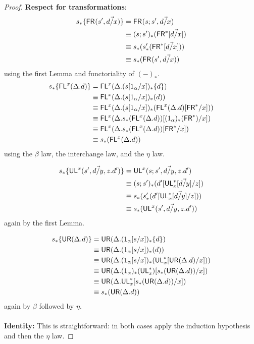 \begin{proof}
\textbf{Respect for transformations}:
\begin{align*}
s_*\{\mathsf{FR}_{}(s',\vec{d/x})\} 
&= \mathsf{FR}_{}(s;s',\vec{d/x}) \\
&\equiv (s;s')_*(\mathsf{FR}^*[\vec{d/x}]) \\
&\equiv s_*(s'_*(\mathsf{FR}^*[\vec{d/x}])) \\
&\equiv s_*(\mathsf{FR}_{}(s',\vec{d/x}))
\end{align*}
using the first Lemma and functoriality of $(-)_*$.
\begin{align*}
s_*\{\mathsf{FL}^{x}(\Delta.d)\} 
&= \mathsf{FL}^{x}(\Delta.(s[1_\alpha/x])_*\{d\}) \\
&\equiv \mathsf{FL}^{x}(\Delta.(s[1_\alpha/x])_*(d)) \\
&\equiv \mathsf{FL}^{x}(\Delta.(s[1_\alpha/x])_*(\mathsf{FL}^{x}(\Delta.d)[\mathsf{FR}^*/x]))\\
&\equiv \mathsf{FL}^{x}(\Delta. s_*(\mathsf{FL}^{x}(\Delta.d))[(1_\alpha)_*(\mathsf{FR}^*)/x])\\
&\equiv \mathsf{FL}^{x}(\Delta. s_*(\mathsf{FL}^{x}(\Delta.d))[\mathsf{FR}^*/x])\\
&\equiv s_*(\mathsf{FL}^{x}(\Delta.d)) 
\end{align*}
using the $\beta$ law, the interchange law, and the $\eta$ law.

\begin{align*}
s_*\{\mathsf{UL}^{x}_{}(s',\vec{d/y},z.d')\} 
&= \mathsf{UL}^{x}_{}(s;s',\vec{d/y},z.d') \\
&\equiv (s;s')_*(d'[\mathsf{UL}^*_{x}[\vec{d/y}]/z]) \\
&\equiv s_*(s'_*(d'[\mathsf{UL}^*_{x}[\vec{d/y}]/z])) \\
&\equiv s_*(\mathsf{UL}^{x}_{}(s',\vec{d/y},z.d')) 
\end{align*}
again by the first Lemma.

\begin{align*}
s_*\{\mathsf{UR}(\Delta.d)\} 
&= \mathsf{UR}(\Delta.(1_\alpha[s/x])_*\{d\}) \\
&\equiv \mathsf{UR}(\Delta.(1_\alpha[s/x])_*(d)) \\
&\equiv \mathsf{UR}(\Delta.(1_\alpha[s/x])_*(\mathsf{UL}^*_{x}[\mathsf{UR}(\Delta.d)/x])) \\
&\equiv \mathsf{UR}(\Delta. (1_\alpha)_*(\mathsf{UL}^*_{x})[s_*(\mathsf{UR}(\Delta.d))/x]) \\
&\equiv \mathsf{UR}(\Delta. \mathsf{UL}^*_{x}[s_*(\mathsf{UR}(\Delta.d))/x]) \\
&\equiv s_*(\mathsf{UR}(\Delta.d))
\end{align*}
again by $\beta$ followed by $\eta$.
\\~\\
\textbf{Identity:} This is straightforward: in both cases apply the induction hypothesis and then the $\eta$ law.
 

\end{proof}
